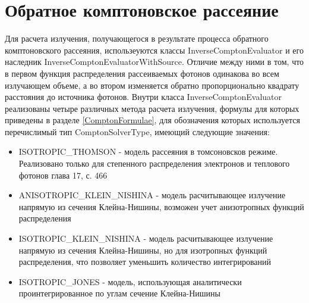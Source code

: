 \section{Обратное комптоновское рассеяние}
Для расчета излучения, получающегося в результате процесса обратного комптоновского рассеяния, использеуются классы InverseComptonEvaluator и его наследник InverseComptonEvaluatorWithSource. Отличие между ними в том, что в первом функция распределения рассеиваемых фотонов одинакова во всем излучающем объеме, а во втором изменяется обратно пропорционально квадрату расстояния до источника фотонов. Внутри класса  InverseComptonEvaluator реализованы четыре различных метода расчета излучения, формулы для которых приведены в разделе \ref{ComptonFormulae}, для обозначения которых используется перечислимый тип ComptonSolverType, имеющий следующие значения:

\begin{itemize}
	\item ISOTROPIC\_THOMSON - модель рассеяния в томсоновсков режиме. Реализовано только для степенного распределения электронов и теплового фотонов \cite{Ginzburg1975} глава 17, с. 466
	\item ANISOTROPIC\_KLEIN\_NISHINA - модель расчитывающее излучение напрямую из сечения Клейна-Нишины, возможен учет анизотропных функций распределения \cite{KleinNishina, Dubus}
	\item ISOTROPIC\_KLEIN\_NISHINA - модель расчитывающее излучение напрямую из сечения Клейна-Нишины, но для изотропных функций распределения, что позволяет уменьшить количество интегрирований
	\item ISOTROPIC\_JONES - модель, использующая аналитически проинтегрированное по углам сечение Клейна-Нишины \cite{JonesCompton, BykovUvarov2000}
\end{itemize}

